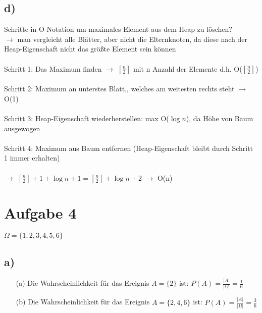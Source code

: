 \documentclass[enabledeprecatedfontcommands, a4paper]{scrartcl}
\begin{document}
\subsection*{d)}

Schritte in O-Notation um maximales Element aus dem Heap zu löschen?
\\
$\rightarrow$ man vergleicht alle Blätter, aber nicht die Elternknoten, da diese nach der Heap-Eigenschaft nicht das größte Element sein können
\\
\\
Schritt 1: Das Maximum finden $\rightarrow$  $[\frac{n}{2}]$ mit n Anzahl der Elemente d.h. O($[\frac{n}{2}]$)
\\
\\
Schritt 2: Maximum an unterstes Blatt,, welches am weitesten rechts steht $\rightarrow$ O(1)
\\
\\
Schritt 3: Heap-Eigenschaft wiederherstellen: max O($\log n$), da Höhe von Baum ausgewogen
\\
\\
Schritt 4: Maximum aus Baum entfernen (Heap-Eigenschaft bleibt durch Schritt 1 immer erhalten) 
\\
\\
$\rightarrow$ $[\frac{n}{2}] + 1 + \log n + 1 = [\frac{n}{2}] +\log n + 2$ $\rightarrow$ O(n)
\newpage
\section*{Aufgabe 4}
$\Omega = \{1, 2, 3, 4, 5, 6\}$
\subsection*{a)}
\begin{itemize}
\item[(a)] 
Die Wahrscheinlichkeit für das Ereignis $A=\{2\}$ ist: $P(A)=\frac{|A|}{|\Omega|}=\frac{1}{6}$
\item[(b)]
Die Wahrscheinlichkeit für das Ereignis $A=\{2, 4, 6\}$ ist: $P(A)=\frac{|A|}{|\Omega|}=\frac{3}{6}$
\end{itemize}
\end{document}

